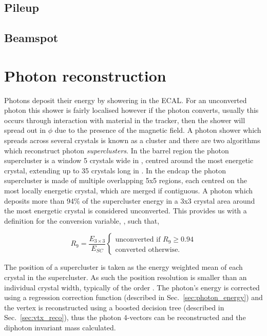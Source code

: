 \subsection{Pileup}
\subsection{Beamspot}

\section{Photon reconstruction}
\label{sec:photon_reco}

Photons deposit their energy by showering in the ECAL. For an unconverted photon this shower is fairly localised however if the photon converts, usually this occurs through interaction with material in the tracker, then the shower will spread out in $\phi$ due to the presence of the magnetic field. A photon shower which spreads across several crystals is known as a cluster and there are two algorithms which reconstruct photon \emph{superclusters}. In the barrel region the photon supercluster is a window 5 crystals wide in \eta, centred around the most energetic crystal, extending up to 35 crystals long in \phi. In the endcap the photon supercluster is made of multiple overlapping 5x5 regions, each centred on the most locally energetic crystal, which are merged if contiguous. A photon which deposits more than 94\% of the supercluster energy in a 3x3 crystal area around the most energetic crystal is considered unconverted. This provides us with a definition for the conversion variable, \rnine, such that,

\begin{equation}
	R_{9} = \frac{E_{3\times3}}{E_{SC}} 
	\begin{cases}
		\text{unconverted if } R_9\geq0.94 \\
		\text{converted otherwise}.
	\end{cases}
\end{equation}

The position of a supercluster is taken as the energy weighted mean of each crystal in the supercluster. As such the position resolution is smaller than an individual crystal width, typically of the order . The photon's energy is corrected using a regression correction function (described in Sec.~\ref{sec:photon_energy}) and the vertex is reconstructed using a boosted decision tree (described in Sec.~\ref{sec:vtx_reco}), thus the photon 4-vectors can be reconstructed and the diphoton invariant mass calculated.

